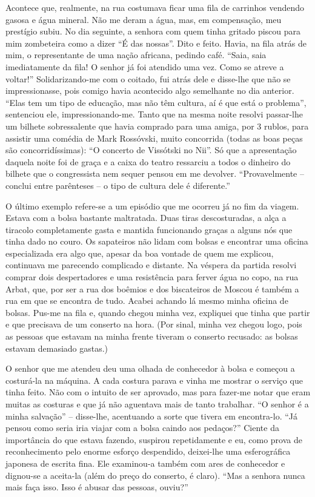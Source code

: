 Acontece que, realmente, na rua costumava ficar uma fila de carrinhos
vendendo gasosa e água mineral. Não me deram a água, mas, em
compensação, meu prestígio subiu. No dia seguinte, a senhora com quem
tinha gritado piscou para mim zombeteira como a dizer ``É das nossas''.
Dito e feito. Havia, na fila atrás de mim, o representante de uma nação
africana, pedindo café. ``Saia, saia imediatamente da fila! O senhor já
foi atendido uma vez. Como se atreve a voltar!'' Solidarizando-me com o
coitado, fui atrás dele e disse-lhe que não se impressionasse, pois
comigo havia acontecido algo semelhante no dia anterior. ``Elas tem um
tipo de educação, mas não têm cultura, aí é que está o problema'',
sentenciou ele, impressionando-me. Tanto que na mesma noite resolvi
passar-lhe um bilhete sobressalente que havia comprado para uma amiga,
por 3 rublos, para assistir uma comédia de Mark Rossóvski, muito
concorrida (todas as boas peças são concorridíssimas): ``O concerto de
Vissótski no Nii''. Só que a apresentação daquela noite foi de graça e a
caixa do teatro ressarciu a todos o dinheiro do bilhete que o
congressista nem sequer pensou em me devolver. ``Provavelmente --
conclui entre parênteses -- o tipo de cultura dele é diferente.''

O último exemplo refere-se a um episódio que me ocorreu já no fim da
viagem. Estava com a bolsa bastante maltratada. Duas tiras
descosturadas, a alça a tiracolo completamente gasta e mantida
funcionando graças a alguns nós que tinha dado no couro. Os sapateiros
não lidam com bolsas e encontrar uma oficina especializada era algo que,
apesar da boa vontade de quem me explicou, continuava me parecendo
complicado e distante. Na véspera da partida resolvi comprar dois
despertadores e uma resistência para ferver água no copo, na rua Arbat,
que, por ser a rua dos boêmios e dos biscateiros de Moscou é também a
rua em que se encontra de tudo. Acabei achando lá mesmo minha oficina de
bolsas. Pus-me na fila e, quando chegou minha vez, expliquei que tinha
que partir e que precisava de um conserto na hora. (Por sinal, minha vez
chegou logo, pois as pessoas que estavam na minha frente tiveram o
conserto recusado: as bolsas estavam demasiado gastas.)

O senhor que me atendeu deu uma olhada de conhecedor à bolsa e começou a
costurá-la na máquina. A cada costura parava e vinha me mostrar o
serviço que tinha feito. Não com o intuito de ser aprovado, mas para
fazer-me notar que eram muitas as costuras e que já não aguentava mais
de tanto trabalhar. ``O senhor é a minha salvação'' -- disse-lhe,
acentuando a sorte que tivera em encontra-lo. ``Já pensou como seria
iria viajar com a bolsa caindo aos pedaços?'' Ciente da importância do
que estava fazendo, suspirou repetidamente e eu, como prova de
reconhecimento pelo enorme esforço despendido, deixei-lhe uma
esferográfica japonesa de escrita fina. Ele examinou-a também com ares
de conhecedor e dignou-se a aceita-la (além do preço do conserto, é
claro). ``Mas a senhora nunca mais faça isso. Isso é abusar das pessoas,
ouviu?''

